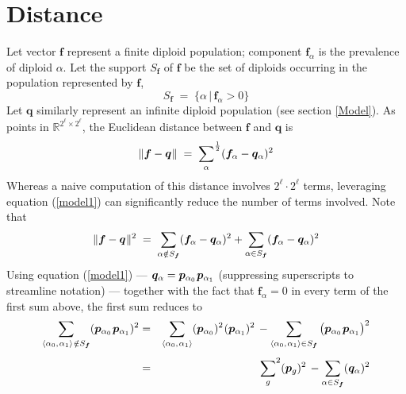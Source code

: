 
\section{Distance}
Let vector ${\bm f}$ represent a finite diploid population; component
${\bm f}_\alpha$ is the prevalence of diploid $\alpha$.  Let the
support $S_{\bm f}$ of ${\bm f}$ be the set of diploids occurring in
the population represented by ${\bm f}$,\\[-0.03in]
\[
S_{\bm f} \; = \; \{ \alpha \, | \, {\bm f}_\alpha > 0 \}
\]
Let ${\bm q}$ similarly represent an infinite diploid population (see
section \ref{Model}).  As points in $\mathbb{R}^{2^\ell
  \times 2^\ell}$, the Euclidean distance between ${\bm f}$ and ${\bm
  q}$ is \\[-0.175in]
\[
\|{\bm f} - {\bm q} \hspace{0.005in} \| \; = \;
  {\sum_{\alpha}}^{\frac{1}{2}} ({\bm f}_\alpha-{\bm q}_\alpha)^2\\[-.02in]
\]
Whereas a naive computation of this distance involves ${2^\ell \cdot
  2^\ell}$ terms, leveraging equation (\ref{model1}) can significantly
reduce the number of terms involved.  Note that
\begin{equation} \label{d1}
\|{\bm f} - {\bm q} \hspace{0.005in} \|^2 \; = \;
\sum_{\alpha \notin {S_{\bm f}}} ({\bm f}_\alpha-{\bm q}_\alpha)^2 +
\sum_{\alpha \in {S_{\bm f}}} ({\bm f}_\alpha-{\bm q}_\alpha)^2 \\[-.02in]
\end{equation}
Using equation (\ref{model1}) --- ${\bm q}_\alpha = {\bm p}_{\alpha_0}
\hspace{0.01in} {\bm p}_{\alpha_1}$ (suppressing superscripts to streamline
notation) --- together with the fact that ${\bm f}_\alpha = 0$ in
every term of the first sum above, the first sum reduces to
\begin{eqnarray}
  \sum_{\langle \alpha_0, \hspace{0.01in} \alpha_1 \rangle \hspace{0.01in} \notin
    {S_{\bm f}}} ({\bm p}_{\alpha_0} \hspace{0.01in} {\bm p}_{\alpha_1})^2 & =
  & \sum_{\langle \alpha_0, \hspace{0.01in} \alpha_1 \rangle} ({\bm
    p}_{\alpha_0})^2 \hspace{0.01in} ({\bm p}_{\alpha_1})^2 \, - \sum_{\langle
    \alpha_0, \hspace{0.01in} \alpha_1 \rangle\in {S_{\bm f}}} \big( {\bm
    p}_{\alpha_0}\hspace{0.01in} {\bm p}_{\alpha_1} \big)^2 \nonumber
  \\[0.05in] & = & {\sum_{g}}^2 ({\bm p}_{g})^2 \, - \sum_{\alpha \in
    {S_{\bm f}}} ( {\bm q}_{\alpha})^2
      \label{d2}
\end{eqnarray}
